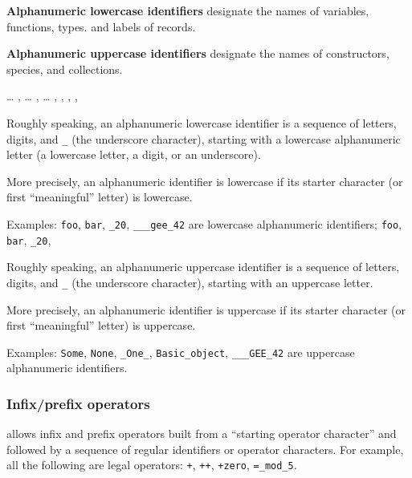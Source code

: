 {\bf Alphanumeric lowercase identifiers} designate the names of variables, functions,
types. and labels of records.

{\bf Alphanumeric uppercase identifiers} designate the names of constructors, species,
and collections.

\begin{syn}
 \is {} \ldots {}
\sep
{} \is {} \ldots {}
\sep
{} \is {} \ldots {}
\sep
{} \is {} \orelse {}
\sep
{} \is \rep{ \tok{\_}} 
\sep
{} \is \rep{ \tok{\_}} 
\sep
{} \is {} \orelse {}
\end{syn}
\vspace{0.2cm}

Roughly speaking, an alphanumeric lowercase identifier is a sequence of
letters, digits, and {\tt \_} (the underscore character), starting with a
lowercase alphanumeric letter (a lowercase letter, a digit, or an
underscore).

More precisely, an alphanumeric identifier is lowercase if its starter
character (or first ``meaningful'' letter) is lowercase.

Examples: {\tt foo}, {\tt bar}, {\tt \_20},
{\tt \_\_\_gee\_42} are lowercase alphanumeric identifiers;
{\tt foo}, {\tt bar}, {\tt \_20},

Roughly speaking, an alphanumeric uppercase identifier is a sequence of
letters, digits, and {\tt \_} (the underscore character), starting with an
uppercase letter.

More precisely, an alphanumeric identifier is uppercase if its starter
character (or first ``meaningful'' letter) is uppercase.

Examples: {\tt Some}, {\tt None}, {\tt \_One\_}, {\tt Basic\_object},
{\tt \_\_\_GEE\_42} are uppercase alphanumeric identifiers.

\subsubsection{Infix/prefix operators}

{\focal} allows infix and prefix operators built from a
``starting operator character'' and followed by a sequence of
regular identifiers or operator characters. For example, all the
following are legal operators:
{\tt +}, {\tt ++}, {\tt \tilde+zero}, {\tt =\_mod\_5}.

